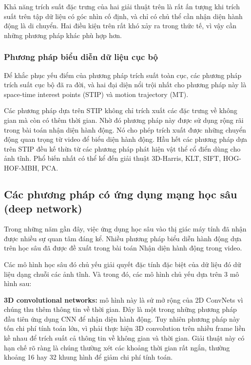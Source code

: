 Khả năng trích suất đặc trưng của hai giải thuật trên là rất ấn tượng khi trích suất trên tập dữ liệu có góc nhìn cố định, và chỉ có chủ thể cần nhận diện hành động là di chuyển. Hai điều kiện trên rất khó xảy ra trong thức tế, vì vậy cần những phương pháp khác phù hợp hơn.


\subsubsection{Phương pháp biểu diễn dữ liệu cục bộ}

Để khắc phục yếu điểm của phương pháp trích suất toàn cục, các phương pháp trích suất cục bộ đã ra đời, và hai đại diện nổi trội nhất cho phương pháp này là space-time interest points (STIP) và motion trajectory (MT).

Các phương pháp dựa trên STIP không chỉ trích xuất các đặc trưng về không gian mà còn có thêm thời gian. Nhờ đó phương pháp này được sử dụng rộng rãi trong bài toán nhận diện hành động. Nó cho phép trích xuất được những chuyển động quan trọng từ video để biểu diện hành động. Hầu hết các phương pháp dựa trên STIP đều kế thừa từ các phương pháp phát hiện vật thể cổ điển dùng cho ảnh tĩnh. Phổ biến nhất có thể kể đến giải thuật 3D-Harris, KLT, SIFT, HOG-HOF-MBH, PCA.




\subsection{Các phương pháp có ứng dụng mạng học sâu (deep network)}

Trong những năm gần đây, việc ứng dụng học sâu vào thị giác máy tính đã nhận được nhiều sự quan tâm đáng kể. Nhiều phương pháp biểu diễn hành động dựa trên học sâu đã được đề xuất trong bài toán Nhận diện hành động trong video.

Các mô hình học sâu đó chủ yếu giải quyết đặc tính đặc biệt của dữ liệu đó dữ liệu dạng chuỗi các ảnh tĩnh. Và trong đó, các mô hình chủ yếu dựa trên 3 mô hình sau:


\textbf{3D convolutional networks:} mô hình này là sử mở rộng của 2D ConvNets vì chúng thu thêm thông tin về thời gian. Đây là một trong những phương pháp đầu tiên ứng dụng CNN để nhận diện hành động. Tuy nhiên phương pháp này tốn chi phí tính toán lớn, vì phải thực hiện 3D convolution trên nhiều frame liền kề nhau để trích suất cả thông tin về không gian và thời gian. Giải thuật này có hạn chế  rõ ràng là chúng thường xét các khoảng thời gian rất ngắn, thường khoảng 16 hay 32 khung hình để giảm chi phí tính toán.

